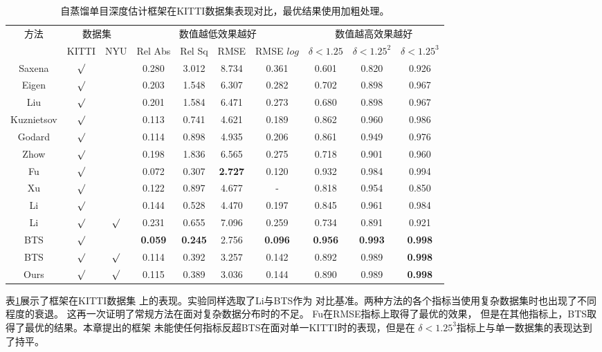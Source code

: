\begin{table}[htb]
  \centering
  \caption{自蒸馏单目深度估计框架在KITTI数据集表现对比，最优结果使用加粗处理。}
  \label{tab:kitti quantitative result}
  \begin{tabular}{c|cc|cccc|ccc}
    \toprule
    \multirow{2}{*}{方法} & \multicolumn{2}{c|}{数据集}& \multicolumn{4}{c|}{数值越低效果越好}&\multicolumn{3}{c}{数值越高效果越好}\\
    &KITTI&NYU& Rel Abs & Rel Sq & RMSE& RMSE $log$ &$\delta<1.25$ &$\delta<1.25^2$ & $\delta<1.25^3$ \\   
    \midrule
    Saxena\cite{Make3D}&$\surd $&&0.280&3.012&
    8.734&0.361&0.601&0.820&0.926\\
    Eigen\cite{eigen2014depth}&$\surd$&&0.203&
    1.548&6.307&0.282&0.702&0.898&0.967\\
    Liu\cite{liu2015learning}&$\surd$&&0.201&1.584&6.471&0.273&0.680&0.898&0.967\\
    Kuznietsov\cite{kuznietsov}&$\surd$&&0.113&0.741&4.621&0.189&0.862&0.960&0.986\\

    Godard\cite{godard2017unsupervised}&$\surd$&&0.114&0.898&4.935&0.206&0.861&0.949&0.976\\
    Zhow\cite{zhou2017unsupervised}&$\surd$&&
    0.198&1.836&6.565&0.275&0.718&0.901&0.960\\
    Fu\cite{FuCVPR18-DORN}&$\surd$&&0.072&0.307&\textbf{2.727}&0.120&0.932&0.984&0.994\\
    Xu\cite{xu2018structured}&$\surd$&&0.122&0.897&4.677&-&0.818&0.954&0.850\\
    \hline
    Li\cite{DABC}&$\surd$&&0.144&0.528&4.470&0.197&0.845&0.961&0.984\\
    Li\cite{DABC}&$\surd$&$\surd$&0.231&0.655&7.096&0.259&0.734&0.891&0.921\\
    \hline
    BTS\cite{bts}&$\surd$&&\textbf{0.059}&\textbf{0.245}&2.756&\textbf{0.096}&\textbf{0.956}&\textbf{0.993}&\textbf{0.998}\\
    BTS\cite{bts}&$\surd$&$\surd$&0.114&0.392&3.257&0.142&0.892&0.989&\textbf{0.998}\\
    Ours&$\surd$&$\surd$&0.115&0.389&3.036&0.144&0.890&0.989&\textbf{0.998}\\
    \bottomrule
  \end{tabular}
\end{table}
表\ref{tab:kitti quantitative result}展示了框架在KITTI数据集
上的表现。实验同样选取了Li\cite{DABC}与BTS\cite{bts}作为
对比基准。两种方法的各个指标当使用复杂数据集时也出现了不同程度的衰退。
这再一次证明了常规方法在面对复杂数据分布时的不足。
Fu\cite{FuCVPR18-DORN}在RMSE指标上取得了最优的效果，
但是在其他指标上，BTS\cite{bts}取得了最优的结果。本章提出的框架
未能使任何指标反超BTS\cite{bts}在面对单一KITTI时的表现，但是在
$\delta<1.25^3$指标上与单一数据集的表现达到了持平。

